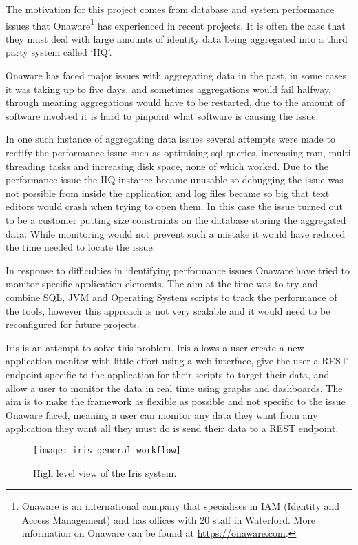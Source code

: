 \documentclass[12pt,a4paper,titlepage]{report}
\begin{document}
The motivation for this project comes from database and system performance issues that Onaware\footnote{Onaware is an international company that specialises in IAM (Identity and Access Management) and has offices with 20 staff in Waterford. More information on Onaware can be found at \url{https://onaware.com}.} has experienced in recent projects. It is often the case that they must deal with large amounts of identity data being aggregated into a third party system called `IIQ'.

Onaware has faced major issues with aggregating data in the past, in some cases it was taking up to five days, and sometimes aggregations would fail halfway, through meaning aggregations would have to be restarted, due to the amount of software involved it is hard to pinpoint what software is causing the issue.

In one such instance of aggregating data issues several attempts were made to rectify the performance issue such as optimising sql queries, increasing ram, multi threading tasks and increasing disk space, none of which worked. Due to the performance issue the IIQ instance became unusable so debugging the issue was not possible from inside the application and log files became so big that text editors would crash when trying to open them. In this case the issue turned out to be a customer putting size constraints on the database storing the aggregated data. While monitoring would not prevent such a mistake it would have reduced the time needed to locate the issue.

In response to difficulties in identifying performance issues Onaware have tried to monitor specific application elements. The aim at the time was to try and combine SQL, JVM and Operating System scripts to track the performance of the tools, however this approach is not very scalable and it would need to be reconfigured for future projects.

Iris is an attempt to solve this problem. Iris allows a user create a new application monitor with little effort using a web interface, give the user a REST endpoint specific to the application for their scripts to target their data, and allow a user to monitor the data in real time using graphs and dashboards. The aim is to make the framework as flexible as possible and not specific to the issue Onaware faced, meaning a user can monitor any data they want from any application they want all they must do is send their data to a REST endpoint.

\begin{figure}[H]
\begin{tcolorbox}
\begin{center}
\texttt{[image: iris-general-workflow]}
\end{center}
\end{tcolorbox}
\caption{High level view of the Iris system.}
\end{figure}
\end{document}
